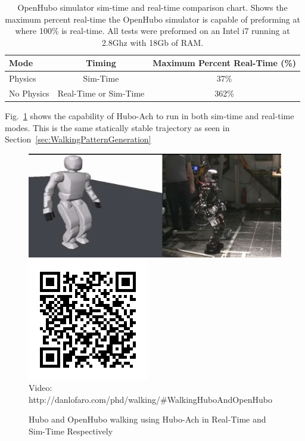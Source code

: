 \begin{table}
\centering
\caption{OpenHubo simulator sim-time and real-time comparison chart.  Shows the maximum percent real-time the OpenHubo simulator is capable of preforming at where 100\% is real-time.  All tests were preformed on an Intel i7 running at 2.8Ghz with 18Gb of RAM.}
\begin{tabular}{| l || c | c |}
\hline
Mode               & Timing                & Maximum Percent Real-Time (\%) \\
\hline
\hline
Physics            & Sim-Time              & 37\%   \\
\hline
No Physics         & Real-Time or Sim-Time & 362\%  \\
\hline
\end{tabular}\label{table:simtime}
\end{table}


Fig.~\ref{fig:huboOpenHuboWalking} shows the capability of Hubo-Ach to run in both sim-time and real-time modes.  
This is the same statically stable trajectory as seen in Section~\ref{sec:WalkingPatternGeneration}


\begin{figure}[thpb]
  \centering
      \includegraphics[width=0.69\columnwidth]{./pix/huboandopenhubowalking.png}
      \includegraphics[width=0.3\columnwidth]{./qrcode/qrcode-hubo-openhubo-walking.png}\\
      Video: http://danlofaro.com/phd/walking/\#WalkingHuboAndOpenHubo
\caption{Hubo and OpenHubo walking using Hubo-Ach in Real-Time and Sim-Time Respectively}
\label{fig:huboOpenHuboWalking}
\end{figure}

